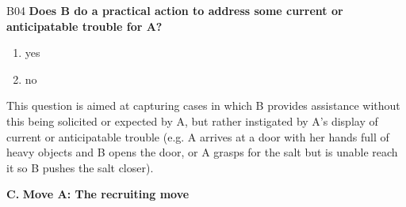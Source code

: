 \documentclass[output=paper]{langsci/langscibook}
\begin{document}
\begin{description}
\item
B04  \textbf{Does B do a practical action to address some current or anticipatable trouble for A?}

\begin{enumerate}
\item{yes}
\item {no}
\end{enumerate}

This question is aimed at capturing cases in which B provides assistance without this being solicited or expected by A, but rather instigated by A’s display of current or anticipatable trouble (e.g. A arrives at a door with her hands full of heavy objects and B opens the door, or A grasps for the salt but is unable reach it so B pushes the salt closer).
\end{description}

\noindent \textbf{C.} \textbf{Move A: The recruiting move}
\end{document}
